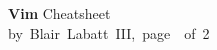 \documentclass[10pt,landscape]{article}
\newcommand{\header}{
\begin{mdframed}[]
\footnotesize
\sffamily
\Large{\textbf{Vim}} \footnotesize Cheatsheet\\
by~Blair~Labatt~III,~page~\thepage~of~2
\end{mdframed}
}
\begin{document}
\small
\begin{multicols*}{4}
\header








\end{multicols*}
\end{document}
